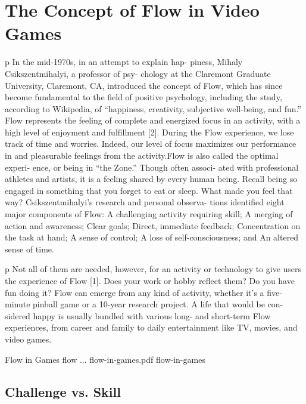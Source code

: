 
\section{The Concept of Flow in Video Games}

p In the mid-1970s, in an attempt to explain hap- piness, Mihaly Csikszentmihalyi, a professor of psy- chology at the Claremont Graduate University, Claremont, CA, introduced the concept of Flow, which has since become fundamental to the field of positive psychology, including the study, according to Wikipedia, of “happiness, creativity, subjective well-being, and fun.” Flow represents the feeling of complete and energized focus in an activity, with a high level of enjoyment and fulfillment [2]. During the Flow experience, we lose track of time and worries. Indeed, our level of focus maximizes our performance in and pleasurable feelings from the activity.Flow is also called the optimal experi- ence, or being in “the Zone.” Though often associ- ated with professional athletes and artists, it is a feeling shared by every human being. Recall being so engaged in something that you forget to eat or sleep. What made you feel that way? Csikszentmihalyi’s research and personal observa- tions identified eight major components of Flow: 
 A challenging activity requiring skill;
 A merging of action and awareness;
 Clear goals;
 Direct, immediate feedback;
 Concentration on the task at hand; 
 A sense of control;
 A loss of self-consciousness; and
 An altered sense of time. 

p Not all of them are needed, however, for an activity or technology to give users the experience of Flow [1]. Does your work or hobby reflect them? Do you have fun doing it? Flow can emerge from any kind of activity, whether it’s a five-minute pinball game or a 10-year research project. A life that would be con- sidered happy is usually bundled with various long- and short-term Flow experiences, from career and family to daily entertainment like TV, movies, and video games. 

\img
{Flow in Games}
{flow ...}
{flow-in-games.pdf}
{flow-in-games}

\subsection{Challenge vs. Skill}

